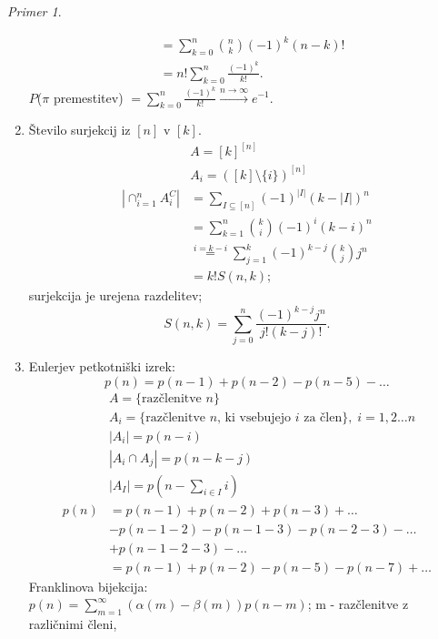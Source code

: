 \documentclass[a4paper, 12pt]{book}
\theoremstyle{definition}
\theoremstyle{remark}
\newtheorem*{ex}{Primer}
\begin{document}
\begin{ex}
\begin{enumerate}[label=(\arabic{*})]
\begin{align*}
        &= \sum_{k=0}^{n} \binom{n}{k} (-1)^k (n-k)! \\
        &= n! \sum_{k=0}^{n} \frac{(-1)^k}{k!}.
      \end{align*}
      $P$($\pi$ premestitev) $= \sum_{k=0}^{n} \frac{(-1)^k}{k!} \stackrel{n \to \infty}{\longrightarrow} e^{-1}$.
    \item Število surjekcij iz $[n]$ v $[k]$.
      \begin{align*}
        &A = [k]^{[n]} \\
        &A_i = ([k] \setminus \{i\})^{[n]} \\
        \left|\cap_{i=1}^n A_i^C\right| &= \sum_{I \subseteq [n]} (-1)^{|I|} (k - |I|)^n \\
        &= \sum_{k=1}^{n} \binom{k}{i} (-1)^i (k-i)^n \\
        &\stackrel{i=k-i}{=} \sum_{j=1}^{k} (-1)^{k-j} \binom{k}{j} j^n \\
        &= k! S(n,k);
      \end{align*}
      surjekcija je urejena razdelitev;
      \begin{equation*}
        S(n,k) = \sum_{j=0}^{n} \frac{(-1)^{k-j} j^n}{j! (k-j)!}.
      \end{equation*}
    \item Eulerjev petkotniški izrek:
      \begin{equation*}
        p(n) = p(n-1) + p(n-2) - p(n-5) - \dots
      \end{equation*}
      \begin{align*}
        &A = \{\text{razčlenitve }n\} \\
        &A_i = \{\text{razčlenitve }n \text{, ki vsebujejo }i \text{ za člen}\}, \; i = 1,2 \dots n \\
        &|A_i| = p(n-i) \\
        &|A_i \cap A_j| = p(n-k-j) \\
        &|A_I| = p(n - \sum_{i \in I} i) \\
        p(n) &= p(n-1) + p(n-2) + p(n-3) + \dots \\
        &- p(n-1-2) - p(n-1-3) - p(n-2-3) - \dots \\
        &+ p(n-1-2-3) - \dots \\
        &= p(n-1) + p(n-2) - p(n-5) - p(n-7) + \dots
      \end{align*}
      Franklinova bijekcija: \\
      $p(n) = \sum_{m=1}^{\infty} (\alpha(m) - \beta(m)) p(n-m)$; m - razčlenitve z različnimi členi, \\

\end{enumerate}
\end{ex}
\end{document}
